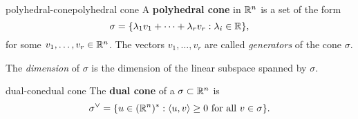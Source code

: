 \begin{topic}{polyhedral-cone}{polyhedral cone}
    A \textbf{polyhedral cone} in $\mathbb{R}^n$ is a set of the form
    \[ \sigma = \{ \lambda_1 v_1 + \cdots + \lambda_r v_r : \lambda_i \in \mathbb{R} \} , \]
    for some $v_1, \ldots, v_r \in \mathbb{R}^n$. The vectors $v_1, \ldots, v_r$ are called \textit{generators} of the cone $\sigma$.
    
    The \textit{dimension} of $\sigma$ is the dimension of the linear subspace spanned by $\sigma$.
\end{topic}

\begin{topic}{dual-cone}{dual cone}
    The \textbf{dual cone} of a  $\sigma \subset \mathbb{R}^n$ is
    \[ \sigma^\vee = \{ u \in (\mathbb{R}^n)^* : \langle u, v \rangle \ge 0 \text{ for all } v \in \sigma \} . \]
\end{topic}
